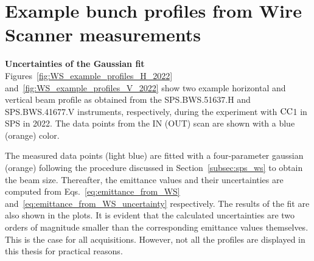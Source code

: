 \section{Example bunch profiles from Wire Scanner measurements}\label{sec:sps_transverse_beam_profiles}

\textbf{Uncertainties of the Gaussian fit}\\
Figures~\ref{fig:WS_example_profiles_H_2022} and~\ref{fig:WS_example_profiles_V_2022} show two example horizontal and vertical beam profile as obtained from the SPS.BWS.51637.H and SPS.BWS.41677.V instruments, respectively, during the experiment with ${\mathrm{CC}}$1 in SPS in 2022. The data points from the IN (OUT) scan are shown with a blue (orange) color. 

The measured data points (light blue) are fitted with a four-parameter gaussian (orange) following the procedure discussed in Section~\ref{subsec:sps_ws} to obtain the beam size. Thereafter, the emittance values and their uncertainties are computed from Eqs.~\eqref{eq:emittance_from_WS} and~\eqref{eq:emittance_from_WS_uncertainty} respectively. The results of the fit are also shown in the plots. It is evident that the calculated uncertainties are two orders of magnitude smaller than the corresponding emittance values themselves. This is the case for all acquisitions. However, not all the profiles are displayed in this thesis for practical reasons.

